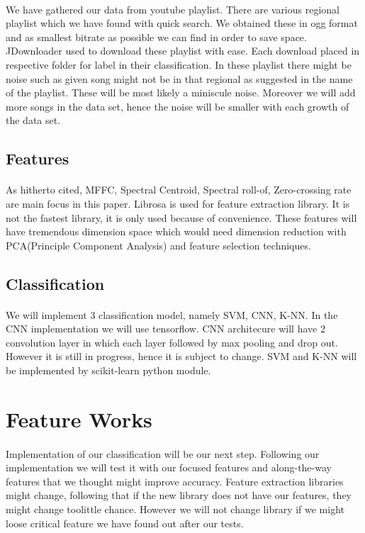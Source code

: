 \documentclass[10pt,twocolumn,letterpaper]{article}
\begin{document}
\paragraph{}We have gathered our data from youtube playlist. There are various regional playlist which we have found with quick search\cite{data_set}. We obtained these in ogg format and as smallest bitrate as possible we can find in order to save space. JDownloader\cite{jdownloader} used to download these playlist with ease. Each download placed in respective folder for label in their classification. In these playlist there might be noise such as given song might not be in that regional as suggested in the name of the playlist. These will be most likely a miniscule noise. Moreover we will add more songs in the data set, hence the noise will be smaller with each growth of the data set. 

\subsection{Features}
\paragraph{}As hitherto cited, MFFC, Spectral Centroid, Spectral roll-of, Zero-crossing rate\cite{genre_classification_tp} are main focus in this paper. Librosa\cite{librosa} is used for feature extraction library. It is not the fastest library, it is only used because of convenience. These features will have tremendous dimension space which would need dimension reduction with PCA(Principle Component Analysis) and feature selection techniques. 

\subsection{Classification}
\paragraph{}We will implement 3 classification model, namely SVM, CNN, K-NN. In the CNN implementation we will use tensorflow. CNN architecure will have 2 convolution layer in which each layer followed by max pooling and drop out. However it is still in progress, hence it is subject to change. SVM and K-NN will be implemented by scikit-learn python module.

\section{Feature Works}
\paragraph{}Implementation of our classification will be our next step. Following our implementation we will test it with our focused features and along-the-way features that we thought might improve accuracy. Feature extraction libraries might change, following that if the new library does not have our features, they might change too\textemdash little chance. However we will not change library if we might loose critical feature we have found out after our tests. 


{\small


}
\end{document}
